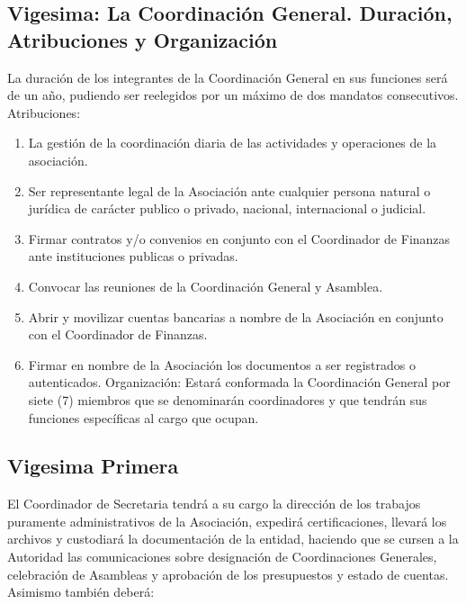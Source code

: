     \subsection{Vigesima: La Coordinaci\'on General. Duraci\'on, Atribuciones y
    Organizaci\'on}

      La duraci\'on de los integrantes de la Coordinaci\'on General en sus
      funciones ser\'a de un a\~no, pudiendo ser reelegidos por un m\'aximo de
      dos mandatos consecutivos. Atribuciones: 
      
        \begin{enumerate}
          \item
            La gesti\'on de la coordinaci\'on diaria de las actividades y
            operaciones de la asociaci\'on.
            
          \item
            Ser representante legal de la Asociaci\'on ante cualquier persona
            natural o jur\'i{}dica de car\'acter publico o privado, nacional,
            internacional o judicial.             

          \item
            Firmar contratos y/o convenios en conjunto con el Coordinador de
            Finanzas ante instituciones publicas o privadas. 
          
          \item
            Convocar las reuniones de la Coordinación General y Asamblea.

          \item
            Abrir y movilizar cuentas bancarias a nombre de la Asociaci\'on en
            conjunto con el Coordinador de Finanzas. 
            
          \item
            Firmar en nombre de la Asociaci\'on los documentos a ser registrados
            o autenticados. Organizaci\'on: Estar\'a conformada la
            Coordinaci\'on General por siete (7) miembros que se denominar\'an
            coordinadores y que tendr\'an sus funciones espec\'i{}ficas al cargo
            que ocupan.
        
        \end{enumerate}

    \subsection{Vigesima Primera}
      El Coordinador de Secretaria tendr\'a a su cargo la direcci\'on de los
      trabajos puramente administrativos de la Asociaci\'on, expedir\'a
      certificaciones, llevar\'a los archivos y custodiar\'a la documentaci\'on
      de la entidad, haciendo que se cursen a la Autoridad las comunicaciones
      sobre designaci\'on de Coordinaciones Generales, celebraci\'on de
      Asambleas y aprobaci\'on de los presupuestos y estado de cuentas. Asimismo
      tambi\'en deber\'a:

